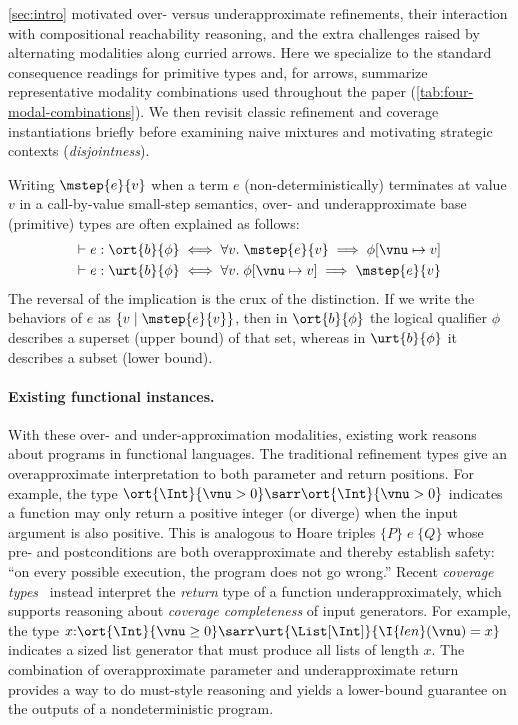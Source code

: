 \autoref{sec:intro} motivated over- versus underapproximate refinements, their
interaction with compositional reachability reasoning, and the extra challenges
raised by alternating modalities along curried arrows.
Here we specialize to the standard consequence readings for primitive types and,
for arrows, summarize representative modality combinations used throughout the
paper (\autoref{tab:four-modal-combinations}).
We then revisit classic refinement and coverage instantiations briefly before
examining naive mixtures and motivating strategic contexts (\emph{disjointness}).

Writing $\mstep{e}{v}$ when a term $e$ (non-deterministically) terminates at value $v$
in a call-by-value small-step semantics, over- and underapproximate base (primitive) types are often explained as follows:
\begin{align*}
    \vdash e : \ort{b}{\phi} &\iff \forall v.\; \mstep{e}{v} \implies \phi[\vnu \mapsto v]
    \\\vdash e : \urt{b}{\phi} &\iff \forall v.\; \phi[\vnu \mapsto v] \implies \mstep{e}{v}
\end{align*}
The reversal of the implication is the crux of the distinction.
If we write the behaviors of $e$ as $\{v \mid \mstep{e}{v}\}$, then in
$\ort{b}{\phi}$ the logical qualifier $\phi$ describes a superset (upper bound) of
that set, whereas in $\urt{b}{\phi}$ it describes a subset (lower bound).

\paragraph{Existing functional instances.}
With these over- and under-approximation modalities, existing work reasons about programs in functional languages.
The traditional refinement types give an overapproximate interpretation to both parameter and return positions. For example, the type $\ort{\Int}{\vnu > 0} \sarr \ort{\Int}{\vnu > 0}$ indicates a function may only return a positive integer (or diverge) when the input argument is also positive. This is analogous to Hoare triples $\{P\}\;e \;\{Q\}$ whose pre- and postconditions are both overapproximate and thereby establish safety:
``on every possible execution, the program does not go wrong.''
Recent \emph{coverage types}~\cite{CoverageType} instead interpret the
\emph{return} type of a function underapproximately, which supports reasoning about
\emph{coverage completeness} of input generators. For example, the type $x{:}\ort{\Int}{\vnu \geq 0} \sarr \urt{\List[\Int]}{\I{len}(\vnu) = x}$ indicates a sized list generator that must produce all lists of length $x$.
The combination of overapproximate parameter and underapproximate return provides a way to do must-style reasoning and yields a lower-bound guarantee on the outputs of a nondeterministic program.


